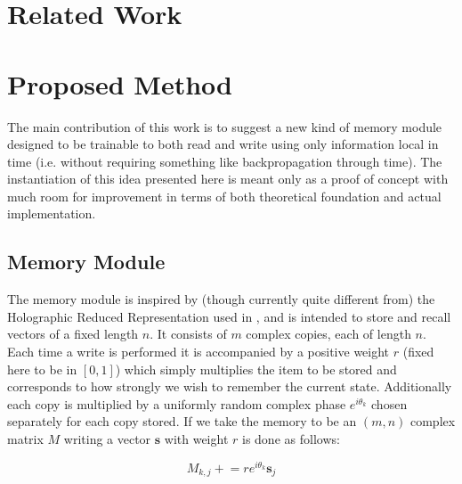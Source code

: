 \documentclass{article}
\begin{document}
\section*{Related Work}

\section*{Proposed Method}
The main contribution of this work is to suggest a new kind of memory module designed to be trainable to both read and write using only information local in time (i.e. without requiring something like backpropagation through time). The instantiation of this idea presented here is meant only as a proof of concept with much room for improvement in terms of both theoretical foundation and actual implementation.
\subsection*{Memory Module}
The memory module is inspired by (though currently quite different from) the Holographic Reduced Representation used in \cite{LSTM}, and is intended to store and recall vectors of a fixed length $n$. It consists of $m$ complex copies, each of length $n$. Each time a write is performed it is accompanied by a positive weight $r$ (fixed here to be in $[0,1]$) which simply multiplies the item to be stored and corresponds to how strongly we wish to remember the current state. Additionally each copy is multiplied by a uniformly random complex phase $e^{i\theta_k}$ chosen separately for each copy stored. If we take the memory to be an $(m,n)$ complex matrix $M$ writing a vector $\pmb{s}$ with weight $r$ is done as follows:

$$M_{k,j}\mathrel{+}=re^{i\theta_k}\pmb{s}_j$$
\end{document}
